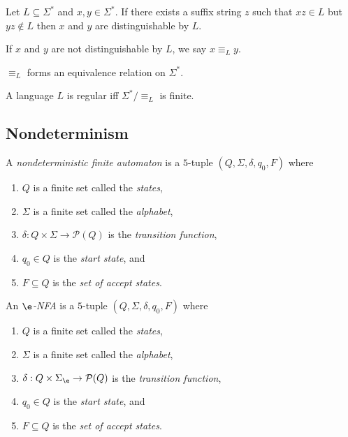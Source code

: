 \documentclass{article}
\begin{document}
\begin{definition*}[Distinguishable]
	Let $L\subseteq \Sigma^*$ and $x,y\in\Sigma^*$. If there exists a suffix string
	$z$ such that $xz\in L$ but $yz\not\in L$ then $x$ and $y$ are distinguishable
	by $L$.

	If $x$ and $y$ are not distinguishable by $L$, we say $x\equiv_L y$.
\end{definition*}

\begin{lemma*}
	$\equiv_L$ forms an equivalence relation on $\Sigma^*$.
\end{lemma*}

\begin{theorem*}
	A language $L$ is regular iff $\Sigma^*/\equiv_L$ is finite.
\end{theorem*}

\subsection{Nondeterminism}

\begin{definition*}
	A \emph{nondeterministic finite automaton} is a $5$-tuple $(Q,\Sigma,\delta,q_0,F)$ where
	\begin{enumerate}
		\item $Q$ is a finite set called the \emph{states},
		\item $\Sigma$ is a finite set called the \emph{alphabet},
		\item $\delta:Q\times\Sigma\to\mathcal{P}(Q)$ is the \emph{transition function},
		\item $q_0\in Q$ is the \emph{start state}, and
		\item $F\subseteq Q$ is the \emph{set of accept states}.
	\end{enumerate}
\end{definition*}

\begin{definition*}
	An \emph{$\e$-NFA} is a $5$-tuple $(Q,\Sigma,\delta,q_0,F)$ where
	\begin{enumerate}
		\item $Q$ is a finite set called the \emph{states},
		\item $\Sigma$ is a finite set called the \emph{alphabet},
		\item $\delta:Q\times\Sigma_\e\to \mathcal{P}(Q)$ is the \emph{transition function},
		\item $q_0\in Q$ is the \emph{start state}, and
		\item $F\subseteq Q$ is the \emph{set of accept states}.
	\end{enumerate}
\end{definition*}
\end{document}
